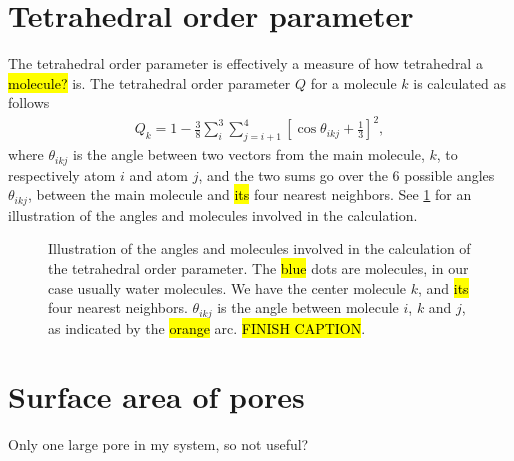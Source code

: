 \section{Tetrahedral order parameter}
The tetrahedral order parameter\cite{errington2001relationship} is effectively a measure of how tetrahedral a \hl{molecule?} is. The tetrahedral order parameter $Q$ for a molecule $k$ is calculated as follows
\begin{align*}
    Q_k = 1 - \frac{3}{8}\sum_i^3\sum_{j=i+1}^4 \left[ \cos \theta_{ikj} + \frac{1}{3} \right]^2,
\end{align*}
where $\theta_{ikj}$ is the angle between two vectors from the main molecule, $k$, to respectively atom $i$ and atom $j$, and the two sums go over the 6 possible angles $\theta_{ikj}$, between the main molecule and \hl{its} four nearest neighbors. See \cref{fig:top_tetrahedra} for an illustration of the angles and molecules involved in the calculation.
%
\begin{figure}[htpb]%
    \centering%
    \caption{%
        Illustration of the angles and molecules involved in the calculation of the tetrahedral order parameter. The \hl{blue} dots are molecules, in our case usually water molecules. We have the center molecule $k$, and \hl{its} four nearest neighbors. $\theta_{ikj}$ is the angle between molecule $i$, $k$ and $j$, as indicated by the \hl{orange} arc. \hl{FINISH CAPTION}. %
        \label{fig:top_tetrahedra}%
    }%
\end{figure}%

\FloatBarrier
\section{Surface area of pores}
    Only one large pore in my system, so not useful?

